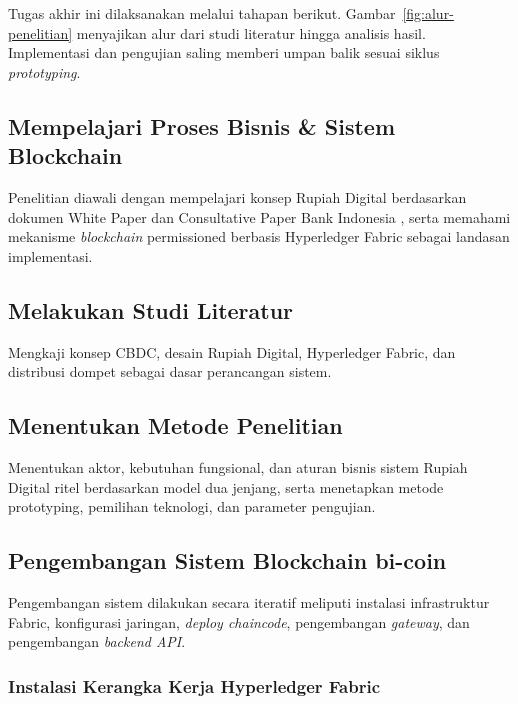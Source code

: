 Tugas akhir ini dilaksanakan melalui tahapan berikut. Gambar~\ref{fig:alur-penelitian}
menyajikan alur dari studi literatur hingga analisis hasil. Implementasi dan
pengujian saling memberi umpan balik sesuai siklus \textit{prototyping}.



\subsection{Mempelajari Proses Bisnis \& Sistem Blockchain}

Penelitian diawali dengan mempelajari konsep Rupiah Digital berdasarkan dokumen
White Paper dan Consultative Paper Bank Indonesia \cite{bi_whitepaper2022,
bi_consultative, bi_garuda_poc}, serta memahami mekanisme \textit{blockchain}
permissioned berbasis Hyperledger Fabric sebagai landasan implementasi.

\subsection{Melakukan Studi Literatur}

Mengkaji konsep CBDC, desain Rupiah Digital, Hyperledger Fabric, dan distribusi
dompet sebagai dasar perancangan sistem.

\subsection{Menentukan Metode Penelitian}

Menentukan aktor, kebutuhan fungsional, dan aturan bisnis sistem Rupiah Digital
ritel berdasarkan model dua jenjang, serta menetapkan metode prototyping,
pemilihan teknologi, dan parameter pengujian.

\subsection{Pengembangan Sistem Blockchain bi-coin}

Pengembangan sistem dilakukan secara iteratif meliputi instalasi infrastruktur
Fabric, konfigurasi jaringan, \textit{deploy chaincode}, pengembangan
\textit{gateway}, dan pengembangan \textit{backend API}.

\subsubsection{Instalasi Kerangka Kerja Hyperledger Fabric}

